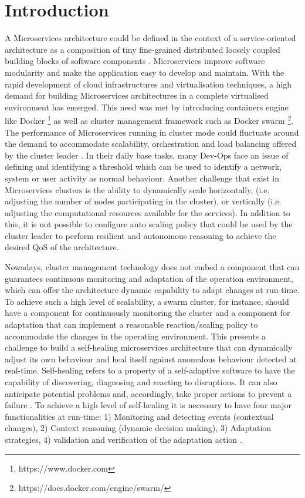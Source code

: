 \documentclass[graybox]{svmult}
\begin{document}
\section{Introduction}
\label{sec:1}
A Microservices architecture could be defined in the context of a service-oriented architecture as a composition of tiny fine-grained distributed loosely coupled building blocks of software components \cite{stubbs2015distributed}. Microservices improve software modularity and make the application easy to develop and maintain. With the rapid development of cloud infrastructures and virtualisation techniques, a high demand for building Microservices architectures in a complete virtualised environment has emerged. This need was met by introducing containers engine like Docker \footnote{https://www.docker.com} as well as cluster management framework such as Docker swarm \footnote{https://docs.docker.com/engine/swarm/}.  
The performance of Microservices running in cluster mode could fluctuate around the demand to accommodate scalability, orchestration and load balancing offered by the cluster leader \cite{stubbs2015distributed}. In their daily base tasks,  many Dev-Ops face an issue of defining and identifying a threshold which can be used to identify a network, system or user activity as normal behaviour. Another challenge that exist in Microservices clusters is the ability to dynamically scale horizontally, (i.e. adjusting the number of nodes participating in the cluster), or vertically (i.e. adjusting the computational resources available for the services). In addition to this, it is not possible to configure auto scaling policy that could be used by the cluster leader to perform resilient and autonomous reasoning to achieve the desired QoS of the architecture. 

Nowadays, cluster management technology does not embed a component that can guarantees continuous monitoring and adaptation of the operation environment, which can offer the architecture dynamic capability to adapt  changes at run-time. To achieve such a high level of scalability, a swarm cluster, for instance, should have a component for continuously monitoring the cluster and a component for adaptation that can implement a reasonable reaction/scaling policy to accommodate the changes in the operating environment. This presents a challenge to build a self-healing microservices architecture that can dynamically adjust its own behaviour and heal itself against anomalous behaviour detected at real-time. Self-healing refers to a property of a self-adaptive software to have the capability of discovering, diagnosing and reacting to disruptions. It can also anticipate potential problems and, accordingly, take proper actions to prevent a failure \cite{Salehie:2009p3693}. To achieve a high level of  self-healing it is necessary to have four major functionalities at run-time: 1) Monitoring and detecting events (contextual changes), 2) Context reasoning (dynamic decision making), 3) Adaptation strategies, 4) validation and verification of the adaptation action \cite{Kapitsaki:2009p3694}.  
\end{document}

